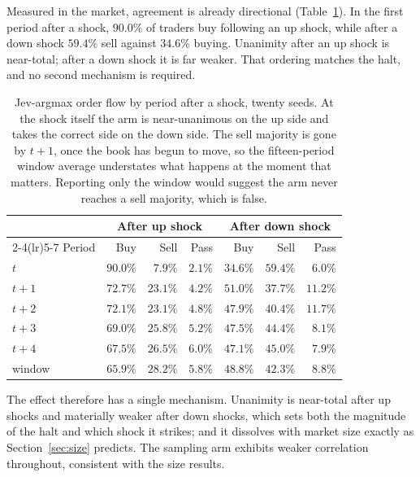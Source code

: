 \documentclass[11pt]{article}
\begin{document}
Measured in the market, agreement is already directional
(Table~\ref{tab:flow}). In the first period after a shock, $90.0\%$ of traders
buy following an up shock, while after a down shock $59.4\%$ sell against
$34.6\%$ buying. Unanimity after an up shock is near-total; after a down shock
it is far weaker. That ordering matches the halt, and no second mechanism is
required.

\begin{table}[t]
\centering
\begin{tabular}{lrrrrrr}
\toprule
& \multicolumn{3}{c}{After up shock} & \multicolumn{3}{c}{After down shock} \\
\cmidrule(lr){2-4}\cmidrule(lr){5-7}
Period & Buy & Sell & Pass & Buy & Sell & Pass \\
\midrule
$t$   & $\mathbf{90.0\%}$ & $7.9\%$  & $2.1\%$ & $34.6\%$ & $\mathbf{59.4\%}$ & $6.0\%$ \\
$t+1$ & $72.7\%$ & $23.1\%$ & $4.2\%$ & $51.0\%$ & $37.7\%$ & $11.2\%$ \\
$t+2$ & $72.1\%$ & $23.1\%$ & $4.8\%$ & $47.9\%$ & $40.4\%$ & $11.7\%$ \\
$t+3$ & $69.0\%$ & $25.8\%$ & $5.2\%$ & $47.5\%$ & $44.4\%$ & $8.1\%$ \\
$t+4$ & $67.5\%$ & $26.5\%$ & $6.0\%$ & $47.1\%$ & $45.0\%$ & $7.9\%$ \\
\midrule
window & $65.9\%$ & $28.2\%$ & $5.8\%$ & $48.8\%$ & $42.3\%$ & $8.8\%$ \\
\bottomrule
\end{tabular}
\caption{Jev-argmax order flow by period after a shock, twenty seeds. At the
shock itself the arm is near-unanimous on the up side and takes the correct
side on the down side. The sell majority is gone by $t+1$, once the book has
begun to move, so the fifteen-period window average understates what happens at
the moment that matters. Reporting only the window would suggest the arm never
reaches a sell majority, which is false.}
\label{tab:flow}
\end{table}

The effect therefore has a single mechanism. Unanimity is near-total after up
shocks and materially weaker after down shocks, which sets both the magnitude
of the halt and which shock it strikes; and it dissolves with market size
exactly as Section~\ref{sec:size} predicts. The sampling arm exhibits weaker
correlation throughout, consistent with the size results.
\end{document}
